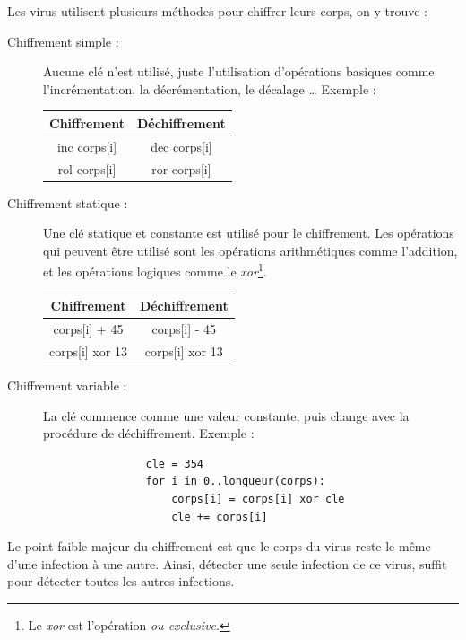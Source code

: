     Les virus utilisent plusieurs méthodes pour chiffrer leurs corps, on y trouve :
    \begin{description}
        \item[Chiffrement simple :] Aucune clé n'est utilisé, juste l'utilisation d'opérations basiques comme
            l'incrémentation, la décrémentation, le décalage \ldots{} Exemple :
            \begin{center}
            \begin{tabular}{cc}
                \toprule
                Chiffrement & Déchiffrement \\
                \midrule
                inc corps[i] & dec corps[i] \\
                rol corps[i] & ror corps[i] \\
                \bottomrule
            \end{tabular}
            \end{center}

        \item[Chiffrement statique :] Une clé statique et constante est utilisé pour le chiffrement. Les opérations
            qui peuvent être utilisé sont les opérations arithmétiques comme l'addition, et les opérations logiques
            comme le \emph{xor}\footnote{Le \emph{xor} est l'opération \emph{ou exclusive}.}.
            \begin{center}
            \begin{tabular}{cc}
                \toprule
                Chiffrement & Déchiffrement \\
                \midrule
                corps[i] + 45 & corps[i] - 45\\
                corps[i] xor 13 & corps[i] xor 13 \\
                \bottomrule
            \end{tabular}
            \end{center}

        \item[Chiffrement variable :] La clé commence comme une valeur constante, puis change avec 
            la procédure de déchiffrement. Exemple :
            \begin{verbatim}
                cle = 354
                for i in 0..longueur(corps):
                    corps[i] = corps[i] xor cle
                    cle += corps[i]
            \end{verbatim}

    \end{description}
    Le point faible majeur du chiffrement est que le corps du virus reste le même d'une infection à une autre. Ainsi, 
    détecter une seule infection de ce virus, suffit pour détecter toutes les autres infections.

